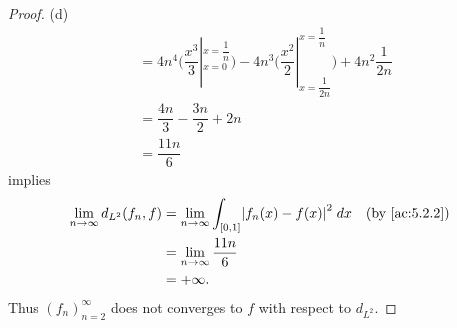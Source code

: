 \begin{proof}{(d)}
\begin{align*}
     & = 4n^4 \bigg(\dfrac{x^3}{3}|_{x = 0}^{x = \dfrac{1}{n}}\bigg) - 4n^3 \bigg(\dfrac{x^2}{2}|_{x = \dfrac{1}{2n}}^{x = \dfrac{1}{n}}\bigg) + 4n^2 \dfrac{1}{2n} \\
     & = \dfrac{4n}{3} - \dfrac{3n}{2} + 2n                                                                                                                         \\
     & = \dfrac{11n}{6}
  \end{align*}
  implies
  \begin{align*}
    \lim_{n \to \infty} d_{L^2}(f_n, f) & = \lim_{n \to \infty} \int_{[0, 1]} \abs{f_n(x) - f(x)}^2 \; dx &  & \by{ac:5.2.2} \\
                                        & = \lim_{n \to \infty} \dfrac{11n}{6}                                               \\
                                        & = +\infty.
  \end{align*}
  Thus \((f_n)_{n = 2}^\infty\) does not converges to \(f\) with respect to \(d_{L^2}\).
\end{proof}